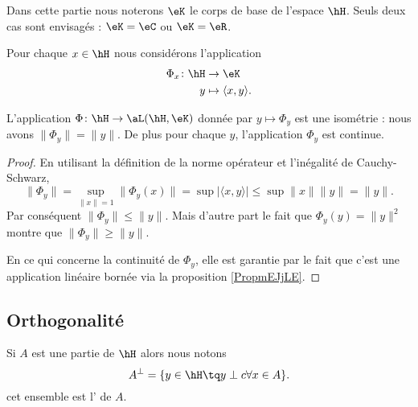 Dans cette partie nous noterons \( \eK\) le corps de base de l'espace \( \hH\). Seuls deux cas sont envisagés : \( \eK=\eC\) ou \( \eK=\eR\).

Pour chaque \( x\in\hH\) nous considérons l'application
\begin{equation}
    \begin{aligned}
        \Phi_x\colon \hH&\to \eK \\
        y&\mapsto \langle x, y\rangle . 
    \end{aligned}
\end{equation}

\begin{lemma}       \label{LemjYVcHE}
    L'application  \( \Phi\colon \hH\to \aL(\hH,\eK)\) donnée par \( y\mapsto\Phi_y\) est une isométrie : nous avons \( \| \Phi_y \|=\| y \|\). De plus pour chaque \( y\), l'application \( \Phi_y\) est continue.
\end{lemma}

\begin{proof}
    En utilisant la définition de la norme opérateur et l'inégalité de Cauchy-Schwarz,
    \begin{equation}
        \| \Phi_y \|=\sup_{\| x \| =1}\| \Phi_y(x) \|=\sup| \langle x, y\rangle  |\leq\sup\| x \|\| y \|=\| y \|.
    \end{equation}
    Par conséquent \( \| \Phi_y \|\leq\| y \|\). Mais d'autre part le fait que \( \Phi_y(y)=\| y \|^2\) montre que \( \| \Phi_y \|\geq \| y \|\).

    En ce qui concerne la continuité de \( \Phi_y\), elle est garantie par le fait que c'est une application linéaire bornée via la proposition \ref{PropmEJjLE}.
\end{proof}

\subsection{Orthogonalité}

Si \( A\) est une partie de \( \hH\) alors nous notons
\begin{equation}
    A^{\perp}=\{ y\in\hH\tq y\perp c\forall x\in A \}.
\end{equation}
cet ensemble est l' de \( A\).

